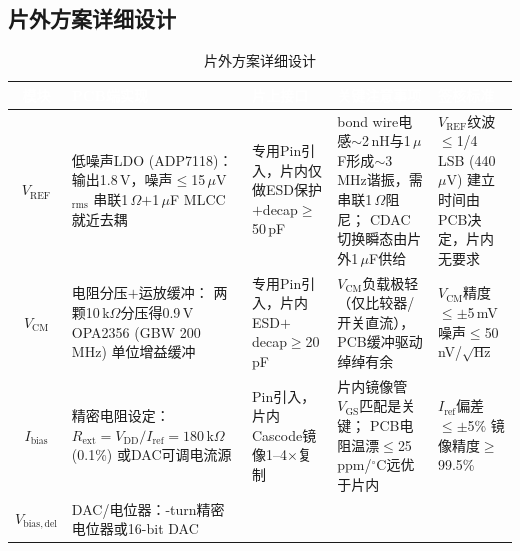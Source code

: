 \documentclass[12pt,a4paper,fontset=none]{ctexart}
\newcommand{\needtable}{\needspace{6cm}}   %
\begin{document}
\needtable
\subsection{片外方案详细设计}

\begin{table}[H]
\centering
\caption{片外方案详细设计}
\scriptsize
\begin{tabular}{@{}cL{1.8cm}L{3.2cm}L{3.2cm}L{3.2cm}@{}}
\toprule
{}
\textcolor{white}{\textbf{模块}} &
\textcolor{white}{\textbf{PCB端实现}} &
\textcolor{white}{\textbf{片上接口}} &
\textcolor{white}{\textbf{关键注意事项}} &
\textcolor{white}{\textbf{签核标准}} \\
\midrule
\textbf{$V_{\mathrm{REF}}$} &
低噪声LDO (ADP7118)：\newline
输出1.8\,V，噪声$\le$15\,$\mu$V$_{\mathrm{rms}}$\newline
串联1\,$\Omega$$+$1\,$\mu$F MLCC就近去耦 &
专用Pin引入，片内仅做ESD保护$+$decap$\ge$50\,pF &
bond wire电感$\sim$2\,nH与1\,$\mu$F形成$\sim$3\,MHz谐振，需串联1\,$\Omega$阻尼；\newline
CDAC切换瞬态由片外1\,$\mu$F供给 &
$V_{\mathrm{REF}}$纹波$\le$1/4\,LSB (440\,$\mu$V)\newline
建立时间由PCB决定，片内无要求 \\
\midrule
\textbf{$V_{\mathrm{CM}}$} &
电阻分压$+$运放缓冲：\newline
两颗10\,k$\Omega$分压得0.9\,V\newline
OPA2356 (GBW 200\,MHz) 单位增益缓冲 &
专用Pin引入，片内ESD$+$decap$\ge$20\,pF &
$V_{\mathrm{CM}}$负载极轻（仅比较器/开关直流），PCB缓冲驱动绰绰有余 &
$V_{\mathrm{CM}}$精度$\le\pm$5\,mV\newline
噪声$\le$50\,nV/$\!\sqrt{\mathrm{Hz}}$ \\
\midrule
\textbf{$I_{\mathrm{bias}}$} &
精密电阻设定：\newline
$R_{\mathrm{ext}}\!=\!V_{\mathrm{DD}}/I_{\mathrm{ref}}\!=\!180$\,k$\Omega$ (0.1\%)\newline
或DAC可调电流源 &
Pin引入，片内Cascode镜像1--4$\times$复制 &
片内镜像管$V_{\mathrm{GS}}$匹配是关键；\newline
PCB电阻温漂$\le$25\,ppm/$^\circ$C远优于片内 &
$I_{\mathrm{ref}}$偏差$\le\pm$5\%\newline
镜像精度$\ge$99.5\% \\
\midrule
\textbf{$V_{\mathrm{bias,del}}$} &
DAC/电位器：-turn精密电位器或16-bit DAC\newline
$$
\end{tabular}
\end{table}
\end{document}
